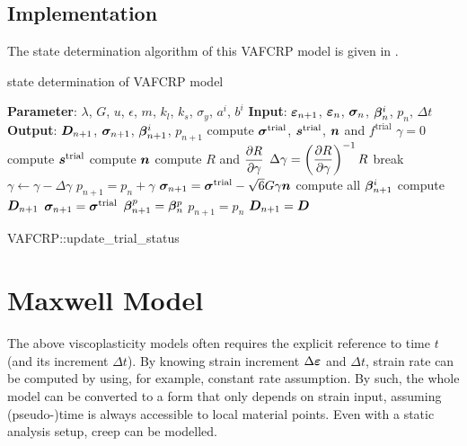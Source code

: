 \subsection{Implementation}
The state determination algorithm of this VAFCRP model is given in .
\begin{breakablealgorithm}
\caption{state determination of VAFCRP model}\label{algo:vafcrp_model}
\begin{algorithmic}
\State \textbf{Parameter}: $\lambda$, $G$, $u$, $\epsilon$, $m$, $k_l$, $k_s$, $\sigma_y$, $a^i$, $b^i$
\State \textbf{Input}: $\bm{\varepsilon}_{n+1}$, $\bm{\varepsilon}_n$, $\bm{\sigma}_n$, $\bm{\beta}_n^i$, $p_n$, $\Delta{}t$
\State \textbf{Output}: $\bm{D}_{n+1}$, $\bm{\sigma}_{n+1}$, $\bm{\beta}_{n+1}^i$, $p_{n+1}$
\State compute $\bm{\sigma}^\text{trial}$, $\bm{s}^\text{trial}$, $\bm{n}$ and $f^\text{trial}$
\State $\gamma=0$
\State compute $\bm{s}^\text{trial}$
\State compute $\bm{n}$
\State compute $R$ and $\dfrac{\partial{R}}{\partial{\gamma}}$
\State $\Delta\gamma=\left(\dfrac{\partial{R}}{\partial{\gamma}}\right)^{-1}R$
\State break
\EndIf
\State $\gamma\leftarrow\gamma-\Delta\gamma$
\State $p_{n+1}=p_n+\gamma$
\EndWhile
\State $\bm{\sigma}_{n+1}=\bm{\sigma}^\text{trial}-\sqrt{6}G\gamma\bm{n}$
\State compute all $\bm{\beta}_{n+1}^i$
\State compute $\bm{D}_{n+1}$
\Else
\State $\bm{\sigma}_{n+1}=\bm{\sigma}^\text{trial}$
\State $\bm{\beta}^p_{n+1}=\bm{\beta}^p_n$
\State $p_{n+1}=p_n$
\State $\bm{D}_{n+1}=\bm{D}$
\EndIf
\end{algorithmic}
\end{breakablealgorithm}
\begin{cppcode}
VAFCRP::update_trial_status
\end{cppcode}
\section{Maxwell Model}
The above viscoplasticity models often requires the explicit reference to time $t$ (and its increment $\Delta{}t$). By knowing strain increment $\Delta{}\bm{\varepsilon}$ and $\Delta{}t$, strain rate can be computed by using, for example, constant rate assumption. By such, the whole model can be converted to a form that only depends on strain input, assuming (pseudo-)time is always accessible to local material points. Even with a static analysis setup, creep can be modelled.

